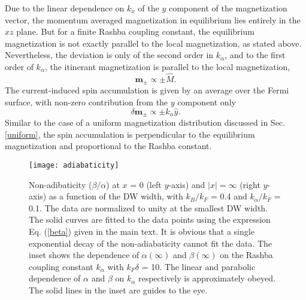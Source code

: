 \documentclass[12pt]{iopart}
\begin{document}
Due to the linear dependence on $k_x$ of the $y$ component of the magnetization vector, the momentum averaged magnetization in equilibrium lies entirely in the $xz$ plane. But for a finite Rashba coupling constant, the equilibrium magnetization is not exactly parallel to the local magnetization, as stated above. Nevertheless, the deviation is only of the second order in $k_ \alpha$, and to the first order of $k_ \alpha$, the itinerant magnetization is parallel to the local magnetization,
\begin{equation}
\textbf{m}_\pm \propto  \pm \hat {M}.
\end{equation}
The current-induced spin accumulation is given by an average over the Fermi surface, with non-zero contribution from the $y$ component only
\begin{equation}
\delta \textbf{m} _\pm \propto \pm k_ \alpha \hat {y}.
\end{equation}
Similar to the case of a uniform magnetization distribution discussed in Sec. \ref{uniform}, the spin accumulation is perpendicular to the equilibrium magnetization and proportional to the Rashba constant.
\begin{figure}
\hspace {4 cm}
\begin{minipage}[c]{0.5\linewidth}\centering
\texttt{[image: adiabaticity]}
\end{minipage}
\caption{Non-adibaticity ($\beta/\alpha$) at $x$ = 0 (left $y$-axis) and $|x| = \infty$ (right $y$-axis) as a function of the DW width, with $k_B/k_F$ = 0.4 and $k_\alpha/k_F$ = 0.1. The data are normalized to unity at the smallest DW width. The solid curves are fitted to the data points using the expression Eq. (\ref{beta}) given in the main text. It is obvious that a single exponential decay of the non-adiabaticity cannot fit the data. The inset shows the dependence of $\alpha(\infty)$ and $\beta(\infty)$ on the Rashba coupling constant $k_\alpha$ with $k_F \delta$ = 10. The linear and parabolic dependence of $\alpha$ and $\beta$ on $k_ \alpha$ respectively is approximately obeyed. The solid lines in the inset are guides to the eye.}
\label{adiab}
\end{figure}
\end{document}
